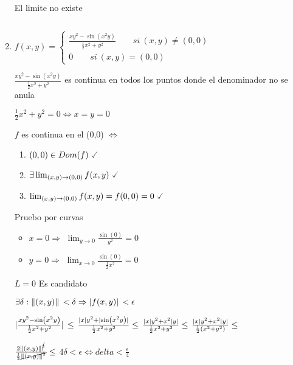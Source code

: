 \documentclass[../practica_03.tex]{subfiles}
\begin{document}
\begin{enumerate}
            El limite no existe

        $ $

        \item $f(x,y) = \left\{
            \begin{array}{ll}
                \frac{xy^2-\sin(x^2y)}{\frac{1}{2}x^2 +y^2} \qquad si\ (x,y)\neq(0,0)\\
                0 \qquad si\ (x,y) = (0,0)
            \end{array}
        \right.$

        $\frac{xy^2-\sin(x^2y)}{\frac{1}{2}x^2 +y^2}$ es continua en todos los puntos donde el denominador no se anula

        $ \frac{1}{2}x^2 +y^2 = 0 \Leftrightarrow x = y = 0 $

        $f$ es continua en el (0,0) $\Leftrightarrow$

        \begin{enumerate}
            \item $(0,0) \in Dom(f)\ \checked$
            \item $\exists \lim_{(x,y)\to (0,0)} f(x,y)\ \checked$
            \item $\lim_{(x,y)\to (0,0)} f(x,y) = f(0,0) = 0\ \checked $
        \end{enumerate}

        Pruebo por curvas

        \begin{itemize} %
            \item $x = 0 \Rightarrow$
                $\lim_{y\to 0} \frac{\sin(0)}{y^2} = 0$
            \item $y = 0 \Rightarrow$
                $\lim_{x\to 0} \frac{\sin(0)}{\frac{1}{2}x^2} = 0$
        \end{itemize}

        $L = 0$ Es candidato

        $ \exists \delta : \norm*{(x,y)} < \delta \Rightarrow \abs*{f(x,y)} < \epsilon $

        $ \abs*{\frac{xy^2-\sin(x^2y)}{\frac{1}{2}x^2 +y^2}} \leq $
        $ \frac{\abs*{x}y^2+\abs*{\sin(x^2y)}}{\frac{1}{2}x^2 +y^2} \leq$
        $ \frac{\abs*{x}y^2+x^2\abs*{y}}{\frac{1}{2}x^2 +y^2} \leq$
        $ \frac{\abs*{x}y^2+x^2\abs*{y}}{\frac{1}{2}(x^2 +y^2)} \leq $

        $ \frac{2\norm*{(x,y)}^{\cancel{3}}}{\frac{1}{2}\cancel{\norm*{(x,y)}^2}} \leq $
        $ 4\delta < \epsilon \Leftrightarrow delta < \frac{\epsilon}{4} $

    \end{enumerate}
\end{document}
